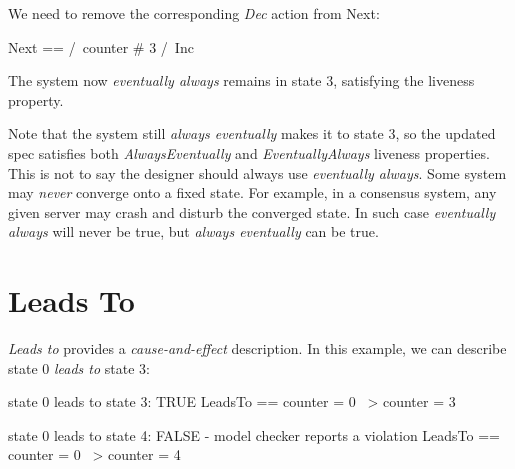 We need to remove the corresponding \textit{Dec} action from Next:\\
\begin{tla}
Next ==
    /\ counter # 3
    /\ Inc
\end{tla}
\begin{tlatex}
%
%
%
\end{tlatex}
\newline 

The system now \textit{eventually always} remains in state 3, satisfying the 
liveness property.\newline 

Note that the system still \textit{always eventually} makes it to state 3, so the
updated spec satisfies both \textit{AlwaysEventually} and
\textit{EventuallyAlways} liveness properties. This is not to say the designer
should always use \textit{eventually always}. Some system may \textit{never}
converge onto a fixed state. For example, in a consensus system, any given server
may crash and disturb the converged state. In such case \textit{eventually
always} will never be true, but \textit{always eventually} can be true.

\section{Leads To}

\textit{Leads to} provides a \textit{cause-and-effect} description. In this example, 
we can describe state 0 \textit{leads to} state 3:\newline
\begin{tla}
    \* state 0 leads to state 3: TRUE 
    LeadsTo == counter = 0 ~> counter = 3

    \* state 0 leads to state 4: FALSE - model checker reports a violation
    LeadsTo == counter = 0 ~> counter = 4
\end{tla}
\begin{tlatex}
%
%
\@xx{}%
\@pvspace{8.0pt}%
%
%
\@xx{}%
\end{tlatex}
\newline

